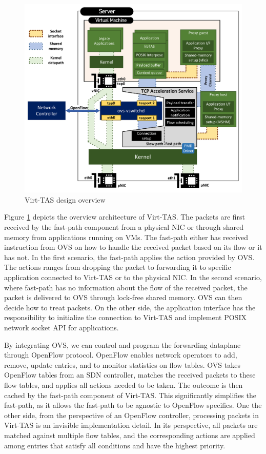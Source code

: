 \begin{figure}
    \centering
    \includegraphics[scale=0.324]{../Figures/design.bigpicture.v2.pdf}
    \caption{Virt-TAS design overview}
    \label{fig:virttas.design.overview}
\end{figure}


Figure \ref{fig:virttas.design.overview} depicts the overview architecture of Virt-TAS. The packets are first received 
by the fast-path component from a physical NIC or through shared memory from applications 
running on VMs. The fast-path either has received instruction from OVS on how to handle 
the received packet based on its flow or it has not. In the first scenario, the fast-path 
applies the action provided by OVS. The actions ranges from dropping the packet to forwarding 
it to specific application connected to Virt-TAS or to the physical NIC. In the second 
scenario, where fast-path has no information about the flow of the received packet,  the 
packet is delivered to OVS through lock-free shared memory. OVS can then decide how to treat 
packets. On the other side, the application interface has the responsibility to initialize the 
connection to Virt-TAS and implement POSIX network socket API for applications.

By integrating OVS, we can control and program the forwarding dataplane through 
OpenFlow protocol. OpenFlow enables network operators to add, remove, update entries,
and to monitor statistics on flow tables. OVS takes OpenFlow tables from an SDN
controller, matches the received packets to these flow tables, and applies 
all actions needed to be taken. The outcome is then cached by the fast-path component
of Virt-TAS. This significantly simplifies the fast-path, as it allows the fast-path to 
be agnostic to OpenFlow specifics. One the other side, from the perspective of an OpenFlow 
controller,  processing packets in Virt-TAS is an invisible implementation detail. In its 
perspective, all packets are matched against multiple flow tables, and the corresponding 
actions are applied among entries that satisfy all conditions and have the highest priority.

